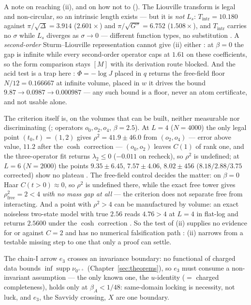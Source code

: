 A note on reaching (ii), and on how not to (). The Liouville transform is legal and
non-circular, so an intrinsic length exists \LT{} --- but it is \emph{not} $L_s$:
$T_{\mathrm{intr}}=10.180$ against $\pi/\sqrt\Delta=3.914$ ($2.601\times$) and $\pi/\sqrt{G''}=6.752$
($1.508\times$), and $T_{\mathrm{intr}}$ carries no $\sigma$ while $L_s$ diverges as $\sigma\to0$ ---
different function types, no substitution \LC. A \emph{second-order} Sturm--Liouville representation
cannot give (ii) either \LN: at $\beta=0$ the gap is infinite while every second-order operator caps at
$1.61$ on these coefficients, so the form comparison stays $[M]$ with its derivation route blocked. And
the acid test is a trap here \LN: $\Phi=-\log J$ placed in $q$ returns the free-field floor
$N/12=0.166667$ at infinite volume, placed in $w$ it drives the bound $9.87\to0.0987\to0.000987$ --- any
such bound is a floor, never an atom certificate, and not usable alone.

The criterion itself is, on the volumes that can be built, neither measurable nor discriminating
(; operators $o_0,o_2,o_4$, $\beta=2.5$). At $L=4$ ($N=4000$) the only legal point
$(t_0,t)=(1,2)$ gives $\rho^2=41.9\pm46.0$ from $(o_2,o_4)$ --- error above value, $11.2$ after the
$\cosh$ correction --- $(o_0,o_2)$ leaves $C(1)$ of rank one, and the three-operator fit returns
$\lambda_2\le0$ ($-0.011$ on recheck), so $\rho^2$ is undefined; at $L=6$ ($N=2000$) the points
$9.35\pm6.45$, $7.57\pm4.06$, $8.02\pm456$ ($8.18/2.88/3.75$ corrected) show no plateau \LE. The
free-field control decides the matter: on $\beta=0$ Haar $C(t>0)\approx0$, so $\rho^2$ is undefined
there, while the exact free tower gives $\rho^2_{\mathrm{free}}=2<4$ \emph{with no mass gap at all} ---
the criterion does not separate free from interacting. And a point with $\rho^2>4$ can be manufactured by
volume: an exact noiseless two-state model with true $2.56$ reads $4.76>4$ at $L=4$ in flat-log and
returns $2.5600$ under the $\cosh$ correction \LE. So the test of (ii) supplies no evidence for or
against $C=2$ and has no numerical falsification path \LN: (ii) narrows from a testable missing step to
one that only a proof can settle.

The chain-I arrow $e_3$ crosses an invariance boundary: no functional of charged data bounds
$\inf\operatorname{supp}\nu_{0^{++}}$ (Chapter~\ref{sec:theorems}), so $e_3$ must consume a non-invariant
assumption --- the only known one, the $u$-identity ($=$ charged completeness), holds only at
$\beta_A<1/48$: same-domain locking is necessity, not luck, and $e_3$, the Savvidy crossing, $X$ are one boundary.

